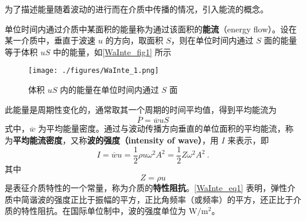 
\begin{issues}
\end{issues}


为了描述能量随着波动的进行而在介质中传播的情况，引入能流的概念。

单位时间内通过介质中某面积的能量称为通过该面积的\textbf{能流}（energy flow）。设在某一介质中，垂直于波速 $u$ 的方向，取面积 $S$，则在单位时间内通过 $S$ 面的能量等于体积 $uS$ 中的能量，如\autoref{WaInte_fig1} 所示
\begin{figure}[ht]
\centering
\texttt{[image: ./figures/WaInte\_1.png]}
\caption{体积 $uS$ 内的能量在单位时间内通过 $S$ 面} \label{WaInte_fig1}
\end{figure}

此能量是周期性变化的，通常取其一个周期的时间平均值，得到平均能流为
\begin{equation}
\overline{P}=\overline{w} u S
\end{equation}
式中，$\overline w$ 为平均能量密度。通过与波动传播方向垂直的单位面积的平均能流，称为\textbf{平均能流密度}，又称\textbf{波的强度（intensity of wave）}，用 $I$ 来表示，即
\begin{equation} \label{WaInte_eq1}
I=\overline{w} u=\frac{1}{2} \rho u \omega^{2} A^{2}=\frac{1}{2} Z \omega^{2} A^{2}~.
\end{equation}
其中
\begin{equation}
Z=\rho u
\end{equation}
是表征介质特性的一个常量，称为介质的\textbf{特性阻抗}。\autoref{WaInte_eq1} 表明，弹性介质中简谐波的强度正比于振幅的平方，正比角频率（或频率）的平方，还正比于介质的特性阻抗。在国际单位制中，波的强度单位为 $\mathrm{W}/\mathrm{m^2}$。